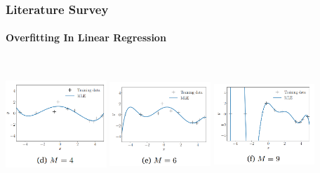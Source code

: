 \documentclass[handout,9pt]{beamer}
\numberwithin{theorem}{section}
\begin{document}
\begin{frame}
	\begin{spacing}{1}
		\frametitle{Literature Survey}
		\framesubtitle{Overfitting In Linear Regression}
		\includegraphics[width=3.8cm, height=5cm]{graph8} \includegraphics[width=3.8cm, height=5cm]{graph9} \includegraphics[width=3.8cm, height=5cm]{graph10}\\
		
	\end{spacing}
\end{frame}
		
\end{document}
